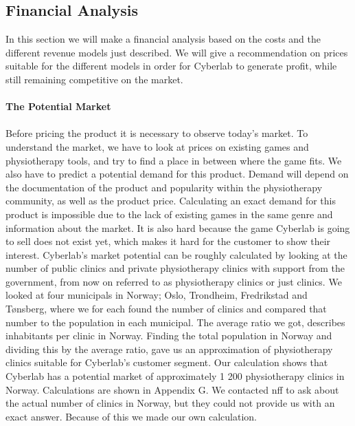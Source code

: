 \subsection{Financial Analysis}
In this section we will make a financial analysis based on the costs and the different revenue models just described. We will give a recommendation on prices suitable for the different models in order for Cyberlab to generate profit, while still remaining competitive on the market. \\ \\
\textbf{The Potential Market} \\ \\
Before pricing the product it is necessary to observe today's market. To understand the market, we have to look at prices on existing games and physiotherapy tools, and try to find a place in between where the game fits. We also have to predict a potential demand for this product. Demand will depend on the documentation of the product and popularity within the physiotherapy community, as well as the product price. Calculating an exact demand for this product is impossible due to the lack of existing games in the same genre and information about the market. It is also hard because the game Cyberlab is going to sell does not exist yet, which makes it hard for the customer to show their interest. Cyberlab’s market potential can be roughly calculated by looking at the number of public clinics and private physiotherapy clinics with support from the government, from now on referred to as physiotherapy clinics or just clinics. We looked at four municipals in Norway; Oslo, Trondheim, Fredrikstad and T{ø}nsberg, where we for each found the number of clinics and compared that number to the population in each municipal. The average ratio we got, describes inhabitants per clinic in Norway. Finding the total population in Norway and dividing this by the average ratio, gave us an approximation of physiotherapy clinics suitable for Cyberlab's customer segment. Our calculation shows that Cyberlab has a potential market of approximately 1 200 physiotherapy clinics in Norway. Calculations are shown in Appendix G. We contacted \ac{nff} to ask about the actual number of clinics in Norway, but they could not provide us with an exact answer. Because of this we made our own calculation.\\ \\
